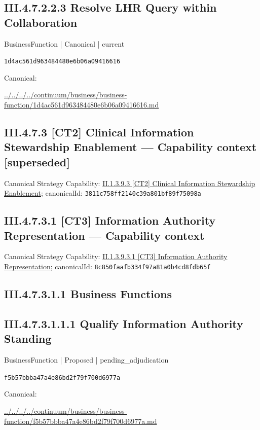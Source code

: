 \documentclass[10pt,a4paper]{article}
\begin{document}
\subsection*{III.4.7.2.2.3 Resolve LHR Query within Collaboration}
\label{element-1d4ac561d963484480e6b06a09416616}
{\small BusinessFunction | Canonical | current}\par
\texttt{1d4ac561d963484480e6b06a09416616}\par
Canonical: \par
{\footnotesize\url{../../../../continuum/business/business-function/1d4ac561d963484480e6b06a09416616.md}}\par
\subsection*{III.4.7.3 [CT2] Clinical Information Stewardship Enablement — Capability context [superseded]}
Canonical Strategy Capability: \hyperref[element-3811c758ff2140c39a801bf89f75098a]{II.1.3.9.3 [CT2] Clinical Information Stewardship Enablement}; canonicalId: \texttt{3811c758ff2140c39a801bf89f75098a}\par
\subsection*{III.4.7.3.1 [CT3] Information Authority Representation — Capability context}
Canonical Strategy Capability: \hyperref[element-8c850faafb334f97a81a0b4cd8fdb65f]{II.1.3.9.3.1 [CT3] Information Authority Representation}; canonicalId: \texttt{8c850faafb334f97a81a0b4cd8fdb65f}\par
\subsection*{III.4.7.3.1.1 Business Functions}
\subsection*{III.4.7.3.1.1.1 Qualify Information Authority Standing}
\label{element-f5b57bbba47a4e86bd2f79f700d6977a}
{\small BusinessFunction | Proposed | pending\_adjudication}\par
\texttt{f5b57bbba47a4e86bd2f79f700d6977a}\par
Canonical: \par
{\footnotesize\url{../../../../continuum/business/business-function/f5b57bbba47a4e86bd2f79f700d6977a.md}}\par
\end{document}
